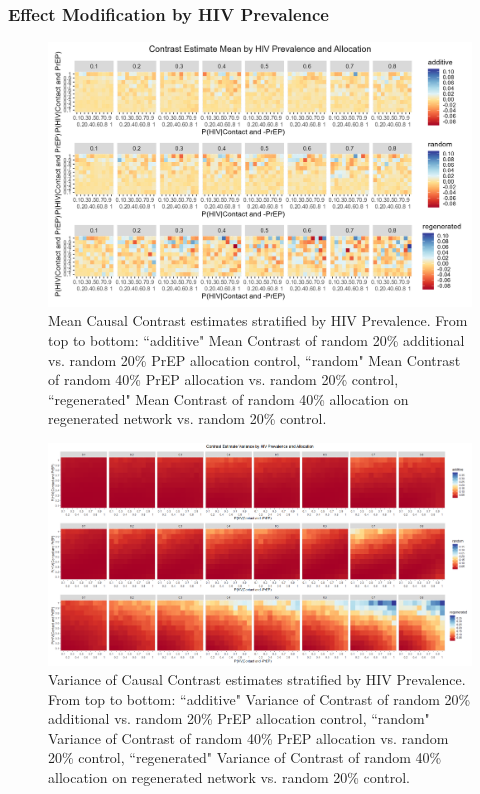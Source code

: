 \documentclass{article}
\theoremstyle{definition}
\begin{document}
\subsubsection{Effect Modification by HIV Prevalence}
\begin{figure}[H]
    \centering
    \includegraphics[scale=0.8]{Figures/HIV Prevalence Mean plots.png}
    \caption{Mean Causal Contrast estimates stratified by HIV Prevalence. From top to bottom: ``additive" Mean Contrast of random 20\% additional vs. random 20\% PrEP allocation control, ``random" Mean Contrast of random 40\% PrEP allocation vs. random 20\% control, ``regenerated" Mean Contrast of random 40\% allocation on regenerated network vs. random 20\% control.}
    \label{fig:Figure 11}
\end{figure}
\begin{figure}[H]
    \centering
    \includegraphics[scale=0.35]{Figures/HIV Prevalence Variance plots.png}
    \caption{Variance of Causal Contrast estimates stratified by HIV Prevalence. From top to bottom: ``additive" Variance of Contrast of random 20\% additional vs. random 20\% PrEP allocation control, ``random" Variance of Contrast of random 40\% PrEP allocation vs. random 20\% control, ``regenerated" Variance of Contrast of random 40\% allocation on regenerated network vs. random 20\% control.}
    \label{fig:Figure 12}
\end{figure}
\end{document}
